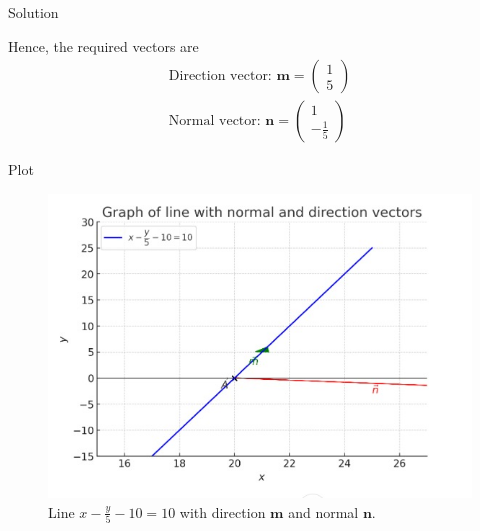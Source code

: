 \documentclass{beamer}
\theoremstyle{remark}
\newcommand{\myvec}[1]{\ensuremath{\begin{pmatrix}#1\end{pmatrix}}}
\let\vec\mathbf
\begin{document}
\begin{frame}{Solution}

  Hence, the required vectors are
\begin{align}
    \text{Direction vector: } \vec{m} = \myvec{1 \\ 5} \label{eq8}\\
    \text{Normal vector: } \vec{n} = \myvec{1 \\ -\tfrac{1}{5}} \label{eq9}
\end{align}  

    
\end{frame}
\begin{frame}{Plot}
    
\begin{figure}[h!]
\centering
\includegraphics[width=0.5\linewidth]{figs/matgeo 4.2.2.jpeg}
 \caption{Line $x - \tfrac{y}{5} - 10 = 10$ with direction $\vec{m}$ and normal $\vec{n}$.}
    \label{fig:4.2.2}
\end{figure}
\end{frame}
\end{document}
